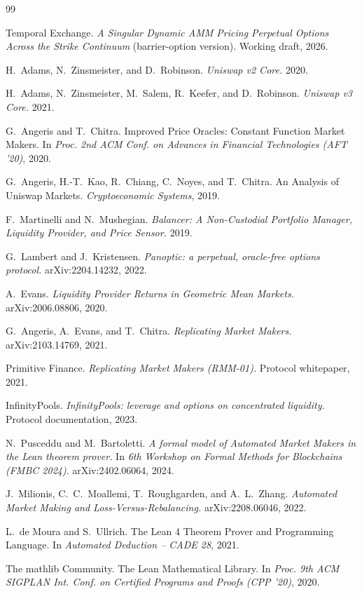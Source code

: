 \documentclass[11pt]{article}
\begin{document}
\begin{thebibliography}{99}

Temporal Exchange.
\emph{A Singular Dynamic AMM Pricing Perpetual Options Across the Strike
Continuum} (barrier-option version). Working draft, 2026.

H.~Adams, N.~Zinsmeister, and D.~Robinson.
\emph{Uniswap v2 Core.} 2020.

H.~Adams, N.~Zinsmeister, M.~Salem, R.~Keefer, and D.~Robinson.
\emph{Uniswap v3 Core.} 2021.

G.~Angeris and T.~Chitra.
Improved Price Oracles: Constant Function Market Makers.
In \emph{Proc. 2nd ACM Conf. on Advances in Financial Technologies (AFT '20)},
2020.

G.~Angeris, H.-T.~Kao, R.~Chiang, C.~Noyes, and T.~Chitra.
An Analysis of Uniswap Markets.
\emph{Cryptoeconomic Systems}, 2019.

F.~Martinelli and N.~Mushegian.
\emph{Balancer: A Non-Custodial Portfolio Manager, Liquidity Provider, and Price
Sensor.} 2019.

G.~Lambert and J.~Kristensen.
\emph{Panoptic: a perpetual, oracle-free options protocol.}
arXiv:2204.14232, 2022.

A.~Evans.
\emph{Liquidity Provider Returns in Geometric Mean Markets.}
arXiv:2006.08806, 2020.

G.~Angeris, A.~Evans, and T.~Chitra.
\emph{Replicating Market Makers.}
arXiv:2103.14769, 2021.

Primitive Finance.
\emph{Replicating Market Makers (RMM-01).}
Protocol whitepaper, 2021.

InfinityPools.
\emph{InfinityPools: leverage and options on concentrated liquidity.}
Protocol documentation, 2023.

N.~Pusceddu and M.~Bartoletti.
\emph{A formal model of Automated Market Makers in the Lean theorem prover.}
In \emph{6th Workshop on Formal Methods for Blockchains (FMBC 2024)}.
arXiv:2402.06064, 2024.

J.~Milionis, C.~C.~Moallemi, T.~Roughgarden, and A.~L.~Zhang.
\emph{Automated Market Making and Loss-Versus-Rebalancing.}
arXiv:2208.06046, 2022.

L.~de Moura and S.~Ullrich.
The Lean 4 Theorem Prover and Programming Language.
In \emph{Automated Deduction -- CADE 28}, 2021.

The mathlib Community.
The Lean Mathematical Library.
In \emph{Proc. 9th ACM SIGPLAN Int. Conf. on Certified Programs and Proofs
(CPP '20)}, 2020.

\end{thebibliography}
\end{document}
